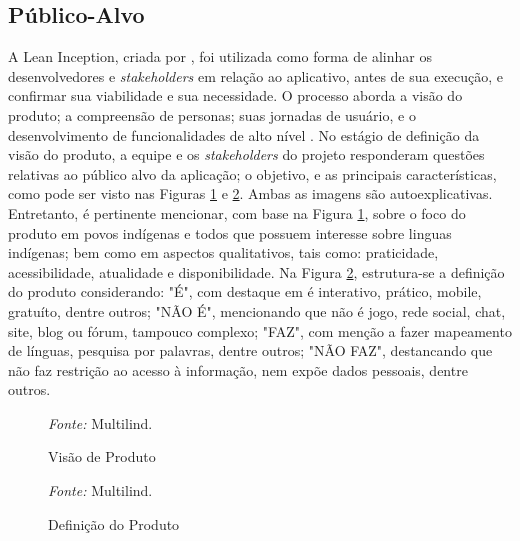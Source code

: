 \subsection{Público-Alvo}
\label{Publico-Alvo}
A Lean Inception, criada por , foi utilizada como forma de alinhar os desenvolvedores e \textit{stakeholders} em relação ao aplicativo, antes de sua execução, e confirmar sua viabilidade e sua necessidade. O processo aborda a visão do produto; a compreensão de personas; suas jornadas de usuário, e 
o desenvolvimento de funcionalidades de alto nível \cite{lean}. No estágio de definição da visão do produto, a equipe e os \textit{stakeholders} do projeto responderam questões relativas ao público alvo da aplicação; o objetivo, e as principais características, como pode ser visto nas 
Figuras \ref{fig11} e \ref{fig12}. Ambas as imagens são autoexplicativas. Entretanto, é pertinente mencionar, com base na Figura \ref{fig11}, sobre o foco do produto em povos indígenas e todos que possuem interesse sobre linguas indígenas; bem como em aspectos qualitativos, tais como: praticidade, acessibilidade, atualidade 
e disponibilidade. Na Figura \ref{fig12}, estrutura-se a definição do produto considerando: "É", com destaque em é interativo, prático, mobile, gratuíto, dentre outros; "NÃO É", mencionando que não é jogo, rede social, chat, site, blog ou fórum, tampouco complexo; "FAZ", com menção a fazer mapeamento de línguas, 
pesquisa por palavras, dentre outros; "NÃO FAZ", destancando que não faz restrição ao acesso à informação, nem expõe dados pessoais, dentre outros.

\begin{figure}[h!]
	\centering
	\caption{Visão de Produto}
	\begin{tablenotes}[flushleft]
		\centering
		\item \textit{Fonte:} Multilind.
	\end{tablenotes}
	\label{fig11}
\end{figure}

\begin{figure}[h!]
	\centering
	\caption{Definição do Produto}
	\begin{tablenotes}[flushleft]
		\centering
		\item \textit{Fonte:} Multilind.
	\end{tablenotes}
	\label{fig12}
\end{figure}

